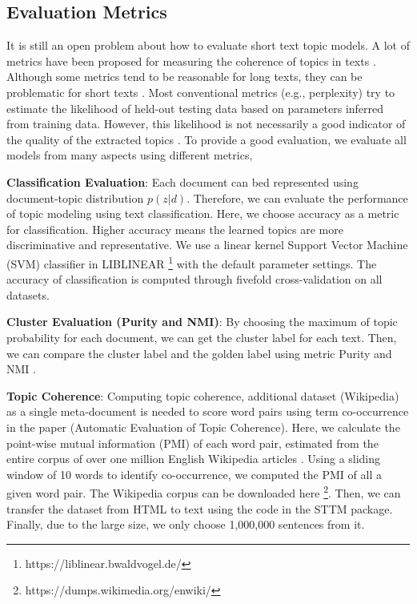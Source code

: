 \documentclass[10pt,journal,compsoc]{IEEEtran}
\begin{document}
{\subsection{Evaluation Metrics}

It is still an open problem about how to evaluate short text topic models. A lot of metrics have been proposed for measuring the coherence of topics in texts \cite{newman2010automatic,mimno2011optimizing}. Although some metrics tend to be reasonable for long texts, they can be problematic for short texts \cite{quan2015short}. Most conventional metrics (e.g., perplexity) try to estimate the likelihood of held-out testing data based on parameters inferred from training data. However, this likelihood is not necessarily a good indicator of the quality of the extracted topics \cite{chang2009reading}. To provide a good evaluation, we evaluate all models from many aspects using different metrics, 

\textbf{Classification Evaluation}: Each document can bed represented using document-topic distribution $p(z|d)$. Therefore, we can evaluate the performance of topic modeling using text classification. Here, we choose accuracy as a metric for classification. Higher accuracy means the learned topics are more discriminative and representative. We use a linear kernel Support Vector Machine (SVM) classifier in LIBLINEAR \footnote{https://liblinear.bwaldvogel.de/} with the default parameter settings. The accuracy of classification is computed through fivefold cross-validation on all datasets.

\textbf{Cluster Evaluation (Purity and NMI)}: By choosing the maximum of topic probability for each document, we can get the cluster label for each text. Then, we can compare the cluster label and the golden label using metric Purity and NMI \cite{huang2013dirichlet,yin2014dirichlet}.

\textbf{Topic Coherence}: Computing topic coherence, additional dataset (Wikipedia) as a single meta-document is needed to score word pairs using term co-occurrence in the paper (Automatic Evaluation of Topic Coherence). Here, we calculate the point-wise mutual information (PMI) of each word pair, estimated from the entire corpus of over one million English Wikipedia articles \cite{li2017enhancing}. Using a sliding window of 10 words to identify co-occurrence, we computed the PMI of all a given word pair. The Wikipedia corpus can be downloaded here \footnote{https://dumps.wikimedia.org/enwiki/}. Then, we can transfer the dataset from HTML to text using the code in the STTM package. Finally, due to the large size, we only choose 1,000,000 sentences from it.

}
\end{document}

